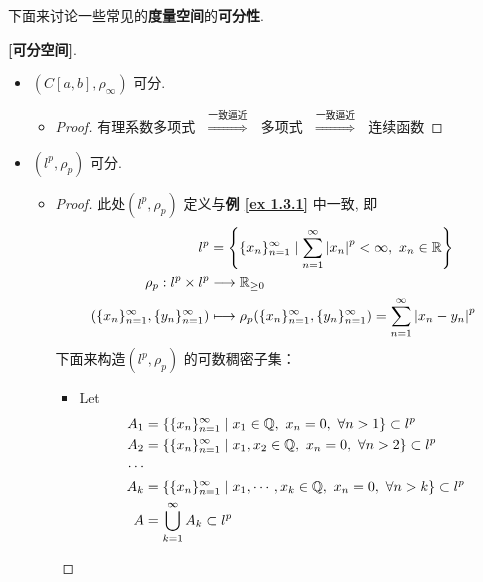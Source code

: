 	\vspace*{6em}
	
	下面来讨论一些常见的\textbf{度量空间}的\textbf{可分性}.
	
	\newpage
	
	\begin{example}\label{ex 1.5.1}
		\textbf{[可分空间]}. 
		\begin{itemize}
			\item $(C[a , b] , \rho_{\infty})$ 可分. 
			
			\begin{itemize}
				\item 
				\begin{proof}
					有理系数多项式 $\,\, \overset{\text{一致逼近}}{\Longrightarrow} \,\,$ 多项式 $\,\, \overset{\text{一致逼近}}{\Longrightarrow} \,\,$ 连续函数
				\end{proof}
			\end{itemize}
			
			\vspace*{0.75em}
			
			\item $(l^p , \rho_p)$ 可分.
			
			\begin{itemize}
				\item 
				\begin{proof}
					此处$(l^p , \rho_p)$ 定义与\textbf{例 \ref{ex 1.3.1}} 中一致, 即
					\begin{align}
						l^p &= \left\{ \{ x_n \}_{n = 1}^{\infty} \mid \sum_{n = 1}^{\infty}{\left| x_n \right|^p} < \infty , \,\, x_n \in \mathbb{R} \right\} \\
						\rho_p : l^p \times l^p &\longrightarrow \mathbb{R}_{\geq 0} \\
						(\{ x_n \}_{n = 1}^{\infty} , \{ y_n \}_{n = 1}^{\infty}) &\longmapsto \rho_p(\{ x_n \}_{n = 1}^{\infty} , \{ y_n \}_{n = 1}^{\infty}) = \sum_{n = 1}^{\infty}{\left| x_n - y_n \right|^p}
					\end{align}
					下面来构造$(l^p , \rho_p)$ 的可数稠密子集：
					
					\begin{itemize}
						\item Let
						\begin{align}
							A_1 &= \left\{ \{ x_n \}_{n = 1}^{\infty} \mid x_1 \in \mathbb{Q} , \,\, x_n = 0 , \,\, \forall n > 1 \right\} \subset l^p \\
							A_2 &= \left\{ \{ x_n \}_{n = 1}^{\infty} \mid x_1 , x_2 \in \mathbb{Q} , \,\, x_n = 0 , \,\, \forall n > 2 \right\} \subset l^p \\
							\cdots & \\
							A_k &= \left\{ \{ x_n \}_{n = 1}^{\infty} \mid x_1 , \cdots , x_k \in \mathbb{Q} , \,\, x_n = 0 , \,\, \forall n > k \right\} \subset l^p \\
							A &= \bigcup_{k = 1}^{\infty}{A_k} \subset l^p
						\end{align}
						

\end{itemize}
\end{proof}
\end{itemize}
\end{itemize}
\end{example}
